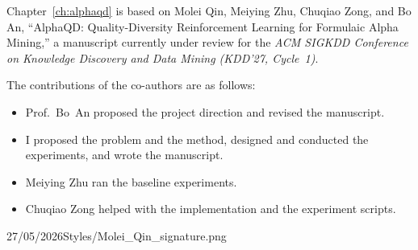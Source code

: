 \documentclass[12pt,a4paper]{Thesis} %
\begin{document}
{	Chapter~\ref{ch:alphaqd} is based on Molei Qin, Meiying Zhu, Chuqiao Zong, and Bo An, ``AlphaQD: Quality-Diversity Reinforcement Learning for Formulaic Alpha Mining,'' a manuscript currently under review for the \emph{ACM SIGKDD Conference on Knowledge Discovery and Data Mining (KDD'27, Cycle~1)}.

	The contributions of the co-authors are as follows:
	\begin{itemize}[topsep=1pt,itemsep=1pt,partopsep=1pt, parsep=1pt]
		\item Prof.\ Bo~An proposed the project direction and revised the manuscript.
		\item I proposed the problem and the method, designed and conducted the experiments, and wrote the manuscript.
		\item Meiying Zhu ran the baseline experiments.
		\item Chuqiao Zong helped with the implementation and the experiment scripts.
	\end{itemize}
}{27/05/2026}{Styles/Molei_Qin_signature.png}


\end{document}
